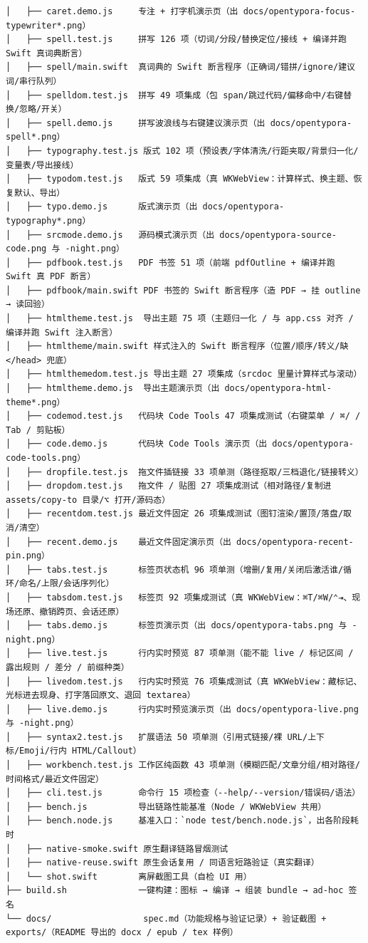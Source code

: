 \documentclass[11pt,a4paper]{ctexart}
\begin{document}
\begin{verbatim}
│   ├── caret.demo.js     专注 + 打字机演示页（出 docs/opentypora-focus-typewriter*.png）
│   ├── spell.test.js     拼写 126 项（切词/分段/替换定位/接线 + 编译并跑 Swift 真词典断言）
│   ├── spell/main.swift  真词典的 Swift 断言程序（正确词/错拼/ignore/建议词/串行队列）
│   ├── spelldom.test.js  拼写 49 项集成（包 span/跳过代码/偏移命中/右键替换/忽略/开关）
│   ├── spell.demo.js     拼写波浪线与右键建议演示页（出 docs/opentypora-spell*.png）
│   ├── typography.test.js 版式 102 项（预设表/字体清洗/行距夹取/背景归一化/变量表/导出接线）
│   ├── typodom.test.js   版式 59 项集成（真 WKWebView：计算样式、换主题、恢复默认、导出）
│   ├── typo.demo.js      版式演示页（出 docs/opentypora-typography*.png）
│   ├── srcmode.demo.js   源码模式演示页（出 docs/opentypora-source-code.png 与 -night.png）
│   ├── pdfbook.test.js   PDF 书签 51 项（前端 pdfOutline + 编译并跑 Swift 真 PDF 断言）
│   ├── pdfbook/main.swift PDF 书签的 Swift 断言程序（造 PDF → 挂 outline → 读回验）
│   ├── htmltheme.test.js  导出主题 75 项（主题归一化 / 与 app.css 对齐 / 编译并跑 Swift 注入断言）
│   ├── htmltheme/main.swift 样式注入的 Swift 断言程序（位置/顺序/转义/缺 </head> 兜底）
│   ├── htmlthemedom.test.js 导出主题 27 项集成（srcdoc 里量计算样式与滚动）
│   ├── htmltheme.demo.js  导出主题演示页（出 docs/opentypora-html-theme*.png）
│   ├── codemod.test.js   代码块 Code Tools 47 项集成测试（右键菜单 / ⌘/ / Tab / 剪贴板）
│   ├── code.demo.js      代码块 Code Tools 演示页（出 docs/opentypora-code-tools.png）
│   ├── dropfile.test.js  拖文件插链接 33 项单测（路径抠取/三档退化/链接转义）
│   ├── dropdom.test.js   拖文件 / 贴图 27 项集成测试（相对路径/复制进 assets/copy-to 目录/⌥ 打开/源码态）
│   ├── recentdom.test.js 最近文件固定 26 项集成测试（图钉渲染/置顶/落盘/取消/清空）
│   ├── recent.demo.js    最近文件固定演示页（出 docs/opentypora-recent-pin.png）
│   ├── tabs.test.js      标签页状态机 96 项单测（增删/复用/关闭后激活谁/循环/命名/上限/会话序列化）
│   ├── tabsdom.test.js   标签页 92 项集成测试（真 WKWebView：⌘T/⌘W/⌃⇥、现场还原、撤销跨页、会话还原）
│   ├── tabs.demo.js      标签页演示页（出 docs/opentypora-tabs.png 与 -night.png）
│   ├── live.test.js      行内实时预览 87 项单测（能不能 live / 标记区间 / 露出规则 / 差分 / 前缀种类）
│   ├── livedom.test.js   行内实时预览 76 项集成测试（真 WKWebView：藏标记、光标进去现身、打字落回原文、退回 textarea）
│   ├── live.demo.js      行内实时预览演示页（出 docs/opentypora-live.png 与 -night.png）
│   ├── syntax2.test.js   扩展语法 50 项单测（引用式链接/裸 URL/上下标/Emoji/行内 HTML/Callout）
│   ├── workbench.test.js 工作区纯函数 43 项单测（模糊匹配/文章分组/相对路径/时间格式/最近文件固定）
│   ├── cli.test.js       命令行 15 项检查（--help/--version/错误码/语法）
│   ├── bench.js          导出链路性能基准（Node / WKWebView 共用）
│   ├── bench.node.js     基准入口：`node test/bench.node.js`，出各阶段耗时
│   ├── native-smoke.swift 原生翻译链路冒烟测试
│   ├── native-reuse.swift 原生会话复用 / 同语言短路验证（真实翻译）
│   └── shot.swift        离屏截图工具（自检 UI 用）
├── build.sh              一键构建：图标 → 编译 → 组装 bundle → ad-hoc 签名
└── docs/                  spec.md（功能规格与验证记录）+ 验证截图 + exports/（README 导出的 docx / epub / tex 样例）
\end{verbatim}
\end{document}
